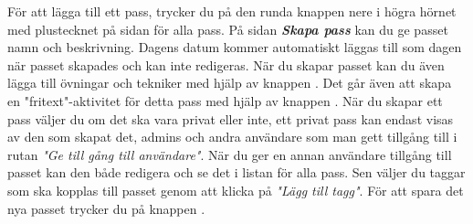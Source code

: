 \documentclass{article}
\newcommand{\term}[1]{\textcolor{secondary}{\textit{\textbf{#1}}}}
\newcommand{\button}[1]{{\tcbox{\textcolor{detail}{#1}}}}
\newcommand*{\img}[1]{%
    \raisebox{-.3\baselineskip}{%
        \texttt{[image: \#1]}%
    }%
}
\begin{document}
{\begin{figure}
        \end{figure}
        För att lägga till ett pass, trycker du på den runda knappen nere i högra hörnet med plustecknet \img{images/icons ref/RoundButton.png} på sidan för alla pass. På sidan \term{Skapa pass} kan du ge passet namn och beskrivning. Dagens datum kommer automatiskt läggas till som dagen när passet skapades och kan inte redigeras. När du skapar passet kan du även lägga till övningar och tekniker med hjälp av knappen \button{+ Aktivitet}. Det går även att skapa en "fritext"-aktivitet för detta pass med hjälp av knappen \button{+ Fri text}. När du skapar ett pass väljer du om det ska vara privat eller inte, ett privat pass kan endast visas av den som skapat det, admins och andra användare som man gett tillgång till i rutan \textit{"Ge till gång till användare"}. När du ger en annan användare tillgång till passet kan den både redigera och se det i listan för alla pass. Sen väljer du taggar som ska kopplas till passet genom att klicka på \textit{"Lägg till tagg"}. För att spara det nya passet trycker du på knappen \button{Spara}.

}
\end{document}
